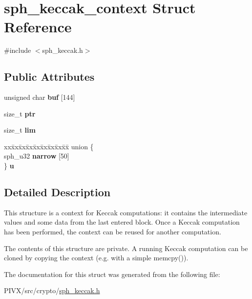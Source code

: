 \hypertarget{structsph__keccak__context}{}\section{sph\+\_\+keccak\+\_\+context Struct Reference}
\label{structsph__keccak__context}


{\ttfamily \#include $<$sph\+\_\+keccak.\+h$>$}

\subsection*{Public Attributes}
\begin{DoxyCompactItemize}
\item 
\mbox{\label{structsph__keccak__context_a05befb157f151a3801b923e6fa910b9e}} 
unsigned char {\bfseries buf} \mbox{[}144\mbox{]}
\item 
\mbox{\label{structsph__keccak__context_a3f5799de9b58573925c8657ce5373f9c}} 
size\+\_\+t {\bfseries ptr}
\item 
\mbox{\label{structsph__keccak__context_a79b7eb8376dd39e5a0d0964dc7b78838}} 
size\+\_\+t {\bfseries lim}
\item 
\mbox{\label{structsph__keccak__context_ac81977e503fcf3a5432cea5bfc68ee6e}} 
\begin{tabbing}
xx\=xx\=xx\=xx\=xx\=xx\=xx\=xx\=xx\=\kill
union \{\\
\>sph\_u32 {\bfseries narrow} \mbox{[}50\mbox{]}\\
\} {\bfseries u}\\

\end{tabbing}\end{DoxyCompactItemize}


\subsection{Detailed Description}
This structure is a context for Keccak computations\+: it contains the intermediate values and some data from the last entered block. Once a Keccak computation has been performed, the context can be reused for another computation.

The contents of this structure are private. A running Keccak computation can be cloned by copying the context (e.\+g. with a simple {\ttfamily memcpy()}). 

The documentation for this struct was generated from the following file\+:\begin{DoxyCompactItemize}
\item 
P\+I\+V\+X/src/crypto/\mbox{\hyperlink{sph__keccak_8h}{sph\+\_\+keccak.\+h}}\end{DoxyCompactItemize}
